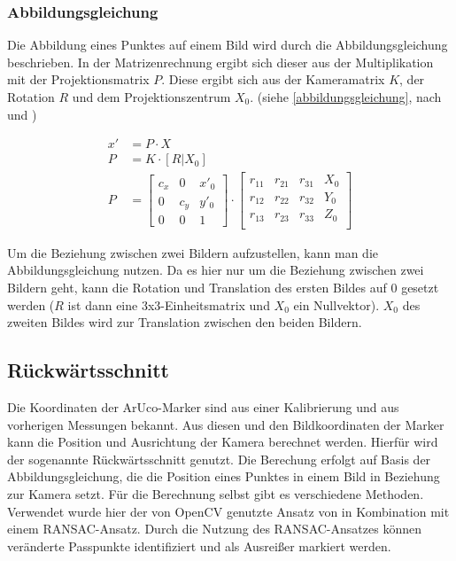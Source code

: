 \documentclass[./00PhotoBox.tex]{subfiles}
\begin{document}
\subsubsection{Abbildungsgleichung}
\label{ss:abbildungsgleichung}
Die Abbildung eines Punktes auf einem Bild wird durch die Abbildungsgleichung beschrieben. In der Matrizenrechnung ergibt sich dieser aus der Multiplikation mit der Projektionsmatrix $P$. Diese ergibt sich aus der Kameramatrix $K$, der Rotation $R$ und dem Projektionszentrum $X_0$. (siehe \autoref{abbildungsgleichung}, nach \citealp[S. 244]{hartley} und \citealp[S. 290]{luhmann})

\begin{align}
    \label{abbildungsgleichung}
    x' & = P \cdot X       \\
    P  & = K \cdot [R|X_0] \\
    P  & =
    \begin{bmatrix}
        c_x & 0   & x'_0 \\
        0   & c_y & y'_0 \\
        0   & 0   & 1
    \end{bmatrix}
    \cdot
    \begin{bmatrix}
        r_11 & r_21 & r_31 & X_0 \\
        r_12 & r_22 & r_32 & Y_0 \\
        r_13 & r_23 & r_33 & Z_0 \\
    \end{bmatrix}
\end{align}

Um die Beziehung zwischen zwei Bildern aufzustellen, kann man die Abbildungsgleichung nutzen. Da es hier nur um die Beziehung zwischen zwei Bildern geht, kann die Rotation und Translation des ersten Bildes auf 0 gesetzt werden ($R$ ist dann eine 3x3-Einheitsmatrix und $X_0$ ein Nullvektor). $X_0$ des zweiten Bildes wird zur Translation zwischen den beiden Bildern. \citep[S. 330]{luhmann}


\subsection{Rückwärtsschnitt}
Die Koordinaten der ArUco-Marker sind aus einer Kalibrierung und aus vorherigen Messungen bekannt. Aus diesen und den Bildkoordinaten der Marker kann die Position und Ausrichtung der Kamera berechnet werden. Hierfür wird der sogenannte Rückwärtsschnitt genutzt. Die Berechung erfolgt auf Basis der Abbildungsgleichung, die die Position eines Punktes in einem Bild in Beziehung zur Kamera setzt. Für die Berechnung selbst gibt es verschiedene Methoden. Verwendet wurde hier der von OpenCV genutzte Ansatz von \citeauthor{Lepetit2008} in Kombination mit einem RANSAC-Ansatz. Durch die Nutzung des RANSAC-Ansatzes können veränderte Passpunkte identifiziert und als Ausreißer markiert werden.
\end{document}
